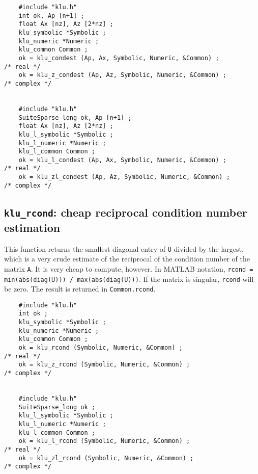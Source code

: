 \documentclass[11pt]{article}
\begin{document}
{\footnotesize
\begin{verbatim}
    #include "klu.h"
    int ok, Ap [n+1] ;
    float Ax [nz], Az [2*nz] ;
    klu_symbolic *Symbolic ;
    klu_numeric *Numeric ;
    klu_common Common ;
    ok = klu_condest (Ap, Ax, Symbolic, Numeric, &Common) ;                           /* real */
    ok = klu_z_condest (Ap, Az, Symbolic, Numeric, &Common) ;                         /* complex */


    #include "klu.h"
    SuiteSparse_long ok, Ap [n+1] ;
    float Ax [nz], Az [2*nz] ;
    klu_l_symbolic *Symbolic ;
    klu_l_numeric *Numeric ;
    klu_l_common Common ;
    ok = klu_l_condest (Ap, Ax, Symbolic, Numeric, &Common) ;                         /* real */
    ok = klu_zl_condest (Ap, Az, Symbolic, Numeric, &Common) ;                        /* complex */
\end{verbatim}
}


\subsection{{\tt klu\_rcond}: cheap reciprocal condition number estimation}

This function returns the smallest diagonal entry of {\tt U} divided by the
largest, which is a very crude estimate of the reciprocal of the condition
number of the matrix {\tt A}.  It is very cheap to compute, however.
In MATLAB notation, {\tt rcond = min(abs(diag(U))) / max(abs(diag(U)))}.
If the matrix is singular, {\tt rcond} will be zero.  The result is returned
in {\tt Common.rcond}.


{\footnotesize
\begin{verbatim}
    #include "klu.h"
    int ok ;
    klu_symbolic *Symbolic ;
    klu_numeric *Numeric ;
    klu_common Common ;
    ok = klu_rcond (Symbolic, Numeric, &Common) ;                                     /* real */
    ok = klu_z_rcond (Symbolic, Numeric, &Common) ;                                   /* complex */


    #include "klu.h"
    SuiteSparse_long ok ;
    klu_l_symbolic *Symbolic ;
    klu_l_numeric *Numeric ;
    klu_l_common Common ;
    ok = klu_l_rcond (Symbolic, Numeric, &Common) ;                                   /* real */
    ok = klu_zl_rcond (Symbolic, Numeric, &Common) ;                                  /* complex */
\end{verbatim}
}
\end{document}
